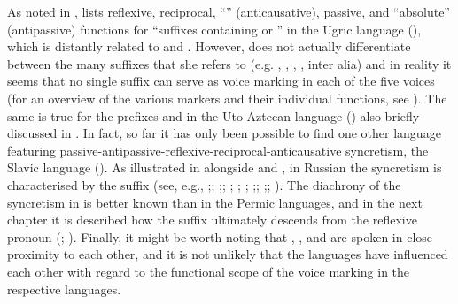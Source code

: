 As noted in , \cite{geniusiene:1987} lists reflexive, reciprocal, “” (anticausative), passive, and “absolute” (antipassive) functions for “suffixes containing  or ” in the Ugric language  (), which is distantly related to  and . However, \citeauthor{geniusiene:1987} does not actually differentiate between the many suffixes that she refers to (e.g. , , , , inter alia) and in reality it seems that no single suffix can serve as voice marking in each of the five voices (for an overview of the various markers and their individual functions, see \citealt{karoly:1982}). The same is true for the prefixes  and  in the Uto-Aztecan language  () also briefly discussed in . In fact, so far it has only been possible to find one other language featuring passive-antipassive-reflexive-reciprocal-anticausative syncretism, the Slavic language  (). As illustrated in  alongside  and , in Russian the syncretism is characterised by the suffix  (see, e.g., \citealt[40ff.]{nedjalkov:silnickij:1969};; \citealt[11f.]{faltz:1985};; \citealt{gerritsen:1990}; \citealt{israeli:1997}; \citealt[902]{kazenin:2001a}; \citealt[680f.]{knjazev:2007};; \citealt[113f.]{malchukov:2015};; \citeyear[7f.]{malchukov:2017}). The diachrony of the syncretism in  is better known than in the Permic languages, and in the next chapter it is described how the suffix  ultimately descends from the  reflexive pronoun  (\citealt[397]{kulikov:2010}; \citeyear[276]{kulikov:2013}). Finally, it might be worth noting that , , and  are spoken in close proximity to each other, and it is not unlikely that the languages have influenced each other with regard to the functional scope of the voice marking in the respective languages.

